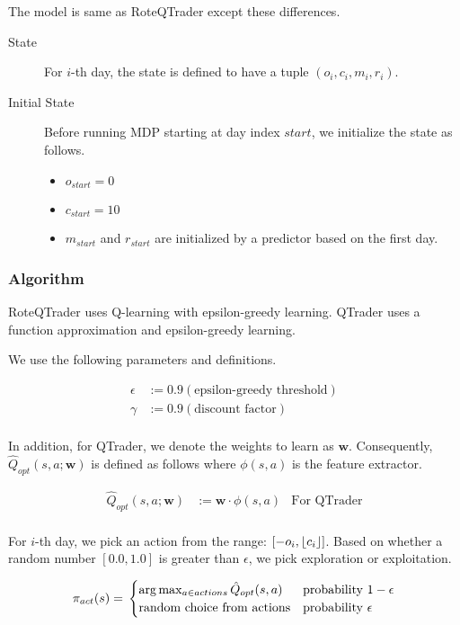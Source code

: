 \documentclass[twocolumn,10pt]{asme2ej}
\newcommand{\vect}[1]{\boldsymbol{#1}}
\DeclarePairedDelimiter\floor{\lfloor}{\rfloor}
\begin{document}
The model is same as RoteQTrader except these differences.

\begin{description}
\item[State] For $i$-th day, the state is defined to have a tuple $(o_i,c_i,m_i,r_i)$.

\item[Initial State] Before running MDP starting at day index $start$,
  we initialize the state as follows.
  \begin{itemize}
  \item $o_{start} = 0$
  \item $c_{start} = 10$
  \item $m_{start}$ and $r_{start}$ are initialized by a predictor
    based on the first day.
  \end{itemize}

\end{description}

\subsubsection{Algorithm }

RoteQTrader uses Q-learning with epsilon-greedy learning. QTrader uses a function approximation and epsilon-greedy
learning.

We use the following parameters and definitions.

\begin{align*}
  \epsilon &:= 0.9 (\text{epsilon-greedy threshold}) \\
  \gamma &:= 0.9 (\text{discount factor}) \\
\end{align*}

In addition, for QTrader, we denote the weights to learn as $\vect{w}$. Consequently, $\hat{Q}_{opt}(s, a; \vect{w})$ is
defined as follows where $\phi(s,a)$ is the feature extractor.

\begin{align*}
  \hat{Q}_{opt}(s, a; \vect{w}) &:= \vect{w} \cdot \phi(s, a) & \text{For QTrader}\\
\end{align*}

For $i$-th day, we pick an action from the range: $[-o_i,\floor*{c_i}]$. Based on whether a random number $[0.0, 1.0]$
is greater than $\epsilon$, we pick exploration or exploitation.

\[
  \pi_{act}(s) = \\
  \begin{cases}
    \arg \max_{a \in actions}\hat{Q}_{opt}(s, a) & \text{probability } 1-\epsilon \\
    \text{random choice from actions} & \text{probability } \epsilon \\
  \end{cases}
\]
\end{document}
